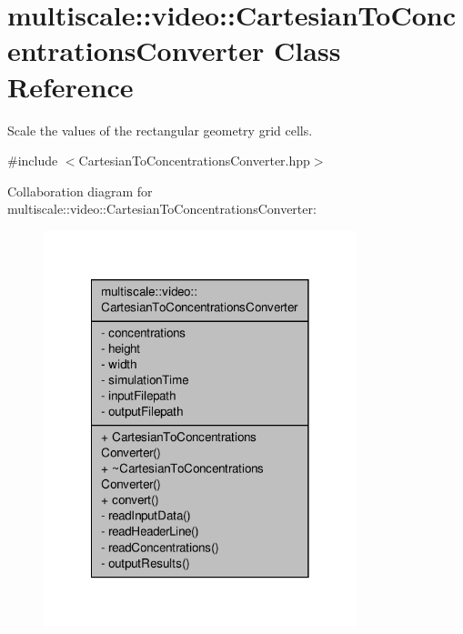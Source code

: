 \hypertarget{classmultiscale_1_1video_1_1CartesianToConcentrationsConverter}{\section{multiscale\-:\-:video\-:\-:Cartesian\-To\-Concentrations\-Converter Class Reference}
\label{classmultiscale_1_1video_1_1CartesianToConcentrationsConverter}
}


Scale the values of the rectangular geometry grid cells.  




{\ttfamily \#include $<$Cartesian\-To\-Concentrations\-Converter.\-hpp$>$}



Collaboration diagram for multiscale\-:\-:video\-:\-:Cartesian\-To\-Concentrations\-Converter\-:\nopagebreak
\begin{figure}[H]
\begin{center}
\leavevmode
\includegraphics[width=258pt]{classmultiscale_1_1video_1_1CartesianToConcentrationsConverter__coll__graph}
\end{center}
\end{figure}
